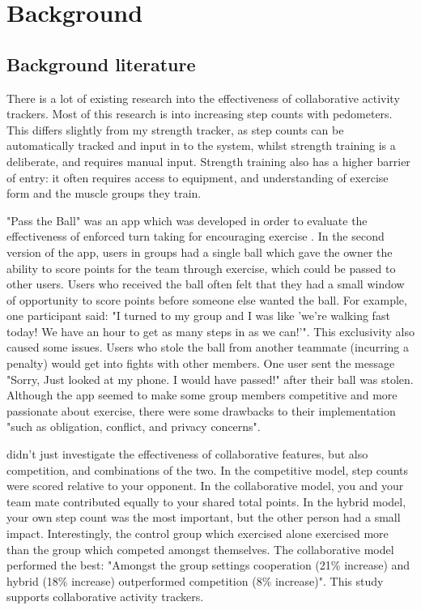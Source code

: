 \documentclass{l4proj}
\begin{document}
\chapter{Background}


\section{Background literature}
There is a lot of existing research into the effectiveness of collaborative activity trackers. Most of this research is into increasing step counts with pedometers. This differs slightly from my strength tracker, as step counts can be automatically tracked and input in to the system, whilst strength training is a deliberate, and requires manual input. Strength training also has a higher barrier of entry: it often requires access to equipment, and understanding of exercise form and the muscle groups they train.

"Pass the Ball" was an app which was developed in order to evaluate the effectiveness of enforced turn taking for encouraging exercise \citep{Pass_the_ball}. In the second version of the app, users in groups had a single ball which gave the owner the ability to score points for the team through exercise, which could be passed to other users. Users who received the ball often felt that they had a small window of opportunity to score points before someone else wanted the ball. For example, one participant said: "I turned to my group and I was like 'we’re walking fast today! We have an hour to get as many steps in as we can!'". This exclusivity also caused some issues. Users who stole the ball from another teammate (incurring a penalty) would get into fights with other members. One user sent the message "Sorry, Just looked at my phone. I would have passed!" after their ball was stolen. Although the app seemed to make some group members competitive and more passionate about exercise, there were some drawbacks to their implementation "such as obligation, conflict, and privacy concerns".

\citet{HealthyTogether} didn't just investigate the effectiveness of collaborative features, but also competition, and combinations of the two. In the competitive model, step counts were scored relative to your opponent. In the collaborative model, you and your team mate contributed equally to your shared total points.  In the hybrid model, your own step count was the most important, but the other person had a small impact. Interestingly, the control group which exercised alone exercised more than the group which competed amongst themselves. The collaborative model performed the best: "Amongst the group settings cooperation (21\% increase) and hybrid (18\% increase) outperformed competition (8\% increase)". This study supports collaborative activity trackers.
\end{document}
